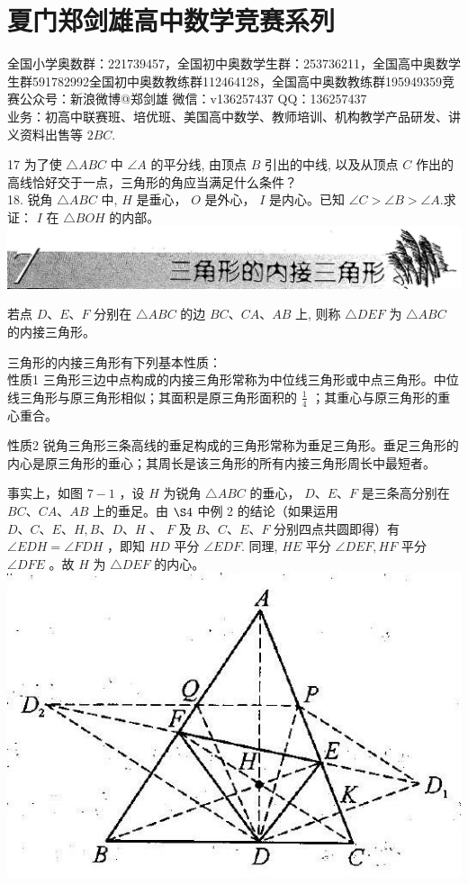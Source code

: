 \documentclass[10pt]{article}
\begin{document}
\section*{夏门郑剑雄高中数学竞赛系列}
全国小学奥数群：221739457，全国初中奥数学生群：253736211，全国高中奥数学生群591782992全国初中奥数教练群112464128，全国高中奥数教练群195949359竞赛公众号：新浪微博@郑剑雄 微信：v136257437 QQ：136257437\\
业务：初高中联赛班、培优班、美国高中数学、教师培训、机构教学产品研发、讲义资料出售等 $2 B C$.

17 为了使 $\triangle A B C$ 中 $\angle A$ 的平分线, 由顶点 $B$ 引出的中线, 以及从顶点 $C$ 作出的高线恰好交于一点，三角形的角应当满足什么条件？\\
18. 锐角 $\triangle A B C$ 中, $H$ 是垂心， $O$ 是外心， $I$ 是内心。已知 $\angle C>\angle B>\angle A$.求证： $I$ 在 $\triangle B O H$ 的内部。\\
\includegraphics[max width=\textwidth, center]{2024_10_30_2c8f45efd4a519b08e1ag-075}

若点 $D 、 E 、 F$ 分别在 $\triangle A B C$ 的边 $B C 、 C A 、 A B$ 上, 则称 $\triangle D E F$ 为 $\triangle A B C$ 的内接三角形。

三角形的内接三角形有下列基本性质：\\
性质1 三角形三边中点构成的内接三角形常称为中位线三角形或中点三角形。中位线三角形与原三角形相似；其面积是原三角形面积的 $\frac{1}{4}$ ；其重心与原三角形的重心重合。

性质2 锐角三角形三条高线的垂足构成的三角形常称为垂足三角形。垂足三角形的内心是原三角形的垂心；其周长是该三角形的所有内接三角形周长中最短者。

事实上，如图 $7-1$ ，设 $H$ 为锐角 $\triangle A B C$ 的垂心， $D 、 E 、 F$ 是三条高分别在 $B C 、 C A 、 A B$ 上的垂足。由 $\S 4$ 中例 2 的结论（如果运用 $D 、 C 、 E 、 H, B 、 D 、 H$ 、 $F$ 及 $B 、 C 、 E 、 F$ 分别四点共圆即得）有 $\angle E D H=\angle F D H$ ，即知 $H D$ 平分 $\angle E D F$. 同理, $H E$ 平分 $\angle D E F, H F$ 平分 $\angle D F E$ 。故 $H$ 为 $\triangle D E F$ 的内心。\\
\includegraphics[max width=\textwidth, center]{2024_10_30_2c8f45efd4a519b08e1ag-075(1)}
\end{document}
